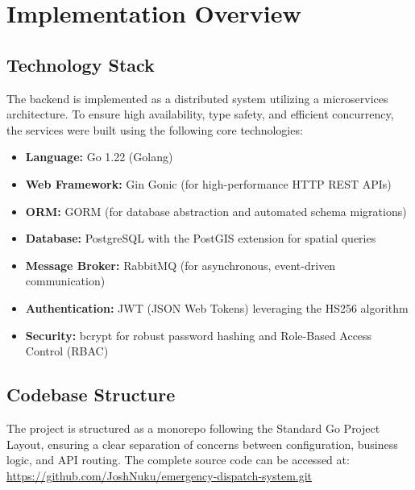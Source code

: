 \documentclass[12pt,a4paper]{report}
\begin{document}
\tableofcontents
\newpage

\chapter{Implementation Overview}

\section{Technology Stack}

The backend is implemented as a distributed system utilizing a microservices architecture. To ensure high availability, type safety, and efficient concurrency, the services were built using the following core technologies:

\begin{itemize}
	\item \textbf{Language:} Go 1.22 (Golang)
	\item \textbf{Web Framework:} Gin Gonic (for high-performance HTTP REST APIs)
	\item \textbf{ORM:} GORM (for database abstraction and automated schema migrations)
	\item \textbf{Database:} PostgreSQL with the PostGIS extension for spatial queries
	\item \textbf{Message Broker:} RabbitMQ (for asynchronous, event-driven communication)
	\item \textbf{Authentication:} JWT (JSON Web Tokens) leveraging the HS256 algorithm
	\item \textbf{Security:} bcrypt for robust password hashing and Role-Based Access Control (RBAC)
\end{itemize}

\section{Codebase Structure}

The project is structured as a monorepo following the Standard Go Project Layout, ensuring a clear separation of concerns between configuration, business logic, and API routing. The complete source code can be accessed at: \url{https://github.com/JoshNuku/emergency-dispatch-system.git}
\end{document}
